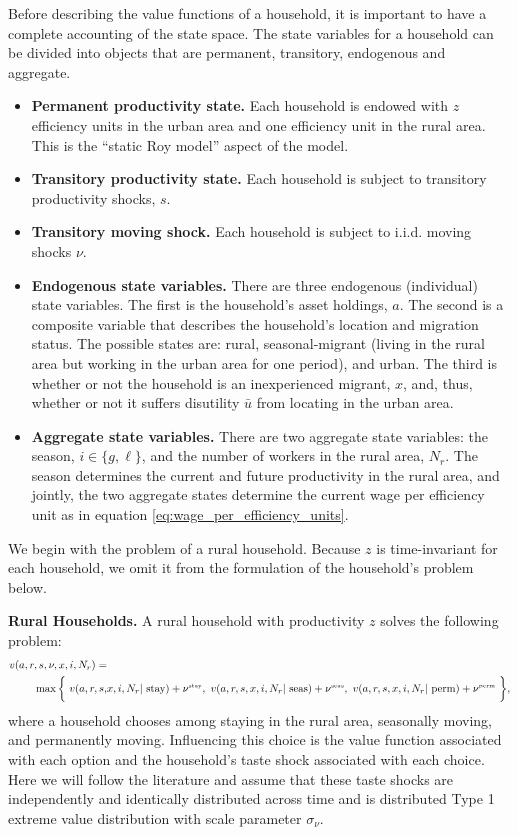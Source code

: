 \documentclass[pdftex,11pt]{article}
\begin{document}
\newpage

Before describing the value functions of a household, it is important to have a complete accounting of the state space. The state variables for a household can be divided into objects that are permanent, transitory, endogenous and aggregate.
\begin{itemize}
\item \textbf{Permanent productivity state.} Each household is endowed with $z$ efficiency units in the urban area and one efficiency unit in the rural area. This is the ``static Roy model'' aspect of the model.

\item \textbf{Transitory productivity state.} Each household is subject to transitory productivity shocks, $s$.

\item \textbf{Transitory moving shock.} Each household is subject to i.i.d. moving shocks $\nu$.

\item \textbf{Endogenous state variables.} There are three endogenous (individual) state variables. The first is the household's asset holdings, $a$. The second is a composite variable that describes the household's location and migration status. The possible states are: rural, seasonal-migrant (living in the rural area but working in the urban area for one period), and urban. The third is whether or not the household is an inexperienced migrant, $x$, and, thus, whether or not it suffers disutility $\bar u$ from locating in the urban area.

\item \textbf{Aggregate state variables.} There are two aggregate state variables: the season, $i \in \{g,\ell \}$, and the number of workers in the rural area, $N_r$. The season determines the current and future productivity in the rural area, and jointly, the two aggregate states determine the current wage per efficiency unit as in equation \eqref{eq:wage_per_efficiency_units}.
\end{itemize}
We begin with the problem of a rural household. Because $z$ is time-invariant for each household, we omit it from the formulation of the household's problem below.

\textbf{Rural Households.} A rural household with productivity $z$ solves the following problem:
\begin{align}
\small
v(a, r, s, \nu, x, i, N_r) =& \nonumber \\
  \max \bigg\{ \ v(a, r,  s, & x, i, N_r| \ \mbox{stay}) + \nu^{\tiny\mbox{stay}},  \ v(a, r, s, x, i, N_r | \ \mbox{seas}) + \nu^{\tiny\mbox{seas}},\  v(a, r, s, x, i, N_r | \ \mbox{perm})+ \nu^{\tiny\mbox{perm}} \ \bigg \},
\label{eq:value_fun_rural}
\end{align}
where a household chooses among staying in the rural area, seasonally moving, and permanently moving. Influencing this choice is the value function associated with each option and the household's taste shock associated with each choice. Here we will follow the literature and assume that these taste shocks are independently and identically distributed across time and is distributed Type 1 extreme value distribution with scale parameter $\sigma_{\nu}$.
\end{document}
